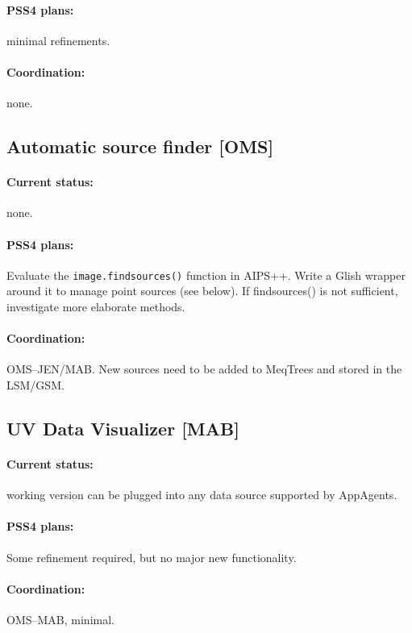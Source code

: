 \documentclass[12pt]{article}
\begin{document}
  \paragraph{PSS4 plans:} minimal refinements.

  \paragraph{Coordination:} none.

\subsection{Automatic source finder [OMS]}

  \paragraph{Current status:} none.

  \paragraph{PSS4 plans:} Evaluate the {\tt image.findsources()} function in
  AIPS++. Write a Glish wrapper around it to manage point sources (see below).
  If findsources() is not sufficient, investigate more elaborate methods.

  \paragraph{Coordination:} OMS--JEN/MAB. New sources need to be added
  to MeqTrees and stored in the LSM/GSM. 

\subsection{UV Data Visualizer [MAB]}

  \paragraph{Current status:} working version can be plugged into any
  data source supported by AppAgents. 

  \paragraph{PSS4 plans:} Some refinement required, but no major new
  functionality. 

  \paragraph{Coordination:} OMS--MAB, minimal.
\end{document}
